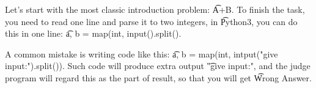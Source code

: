 Let's start with the most classic introduction problem: \t{A+B}.
To finish the task, you need to read one line and parse it to two integers,
in \t{Python3}, you can do this in one line: \t{a, b = map(int, input().split()}.

A common mistake is writing code like this: \t{a, b = map(int, intput("give input:").split())}.
Such code will produce extra output \t{"give input:"}, and the judge program will regard this as the part of result,
so that you will get \t{Wrong Answer}.
